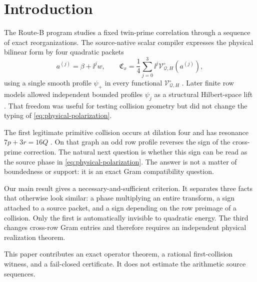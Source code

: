 \section{Introduction}

The Route-B program studies a fixed twin-prime correlation through a sequence of exact
reorganizations.  The source-native scalar compiler expresses the physical bilinear
form by four quadratic packets
\begin{equation}
 a^{(j)}=\beta+\ii^j w,\qquad
 \mathfrak C_x=\frac14\sum_{j=0}^3\ii^j
 \mathcal V^{\circ}_{\mathcal Q,H}(a^{(j)}),
 \label{eq:physical-polarization}
\end{equation}
using a single smooth profile $\psi_+$ in every functional
$\mathcal V^{\circ}_{\mathcal Q,H}$ \cite{tpc59}.  Later finite row models allowed
independent bounded profiles $\psi_j$ as a structural Hilbert-space lift
\cite{tpc218}.  That freedom was useful for testing collision geometry but did not
change the typing of \eqref{eq:physical-polarization}.

The first legitimate primitive collision occurs at dilation four and has resonance
$7p+3r=16Q$ \cite{tpc226}.  On that graph an odd row profile reverses the sign of the
cross-prime correction.  The natural next question is whether this sign can be read as
the source phase in \eqref{eq:physical-polarization}.  The answer is not a matter of
boundedness or support: it is an exact Gram compatibility question.

Our main result gives a necessary-and-sufficient criterion.  It separates three facts
that otherwise look similar: a phase multiplying an entire transform, a sign attached
to a source packet, and a sign depending on the row preimage of a collision.  Only the
first is automatically invisible to quadratic energy.  The third changes cross-row
Gram entries and therefore requires an independent physical realization theorem.

This paper contributes an exact operator theorem, a rational first-collision witness,
and a fail-closed certificate.  It does not estimate the arithmetic source sequences.
